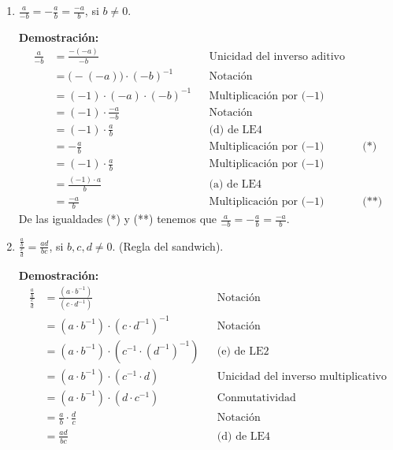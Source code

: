 \documentclass[11pt]{article}
\begin{document}
\begin{enumerate}[label=\alph*)]
    \item $\frac{a}{-b} = -\frac{a}{b}=\frac{-a}{b}$, si $b\neq 0$.
    
    \textbf{Demostración:} \begin{align*}
        \frac{a}{-b} &= \frac{-(-a)}{-b} && \text{Unicidad del inverso aditivo}\\
        &= \bigl(-(-a)\bigr) \cdot (-b)^{-1} && \text{Notación}\\
        &=(-1)\cdot (-a) \cdot (-b)^{-1} && \text{Multiplicación por ($-1$)}\\
        &=(-1) \cdot \frac{-a}{-b} && \text{Notación}\\
        &= (-1) \cdot \frac{a}{b} && \text{(d) de LE4}\\
        &= -\frac{a}{b} && \text{Multiplicación por ($-1$)} && \text{(*)}\\
        &= (-1) \cdot \frac{a}{b} && \text{Multiplicación por ($-1$)}\\
        &= \frac{(-1)\cdot a}{b} && \text{(a) de LE4}\\
        &= \frac{-a}{b} && \text{Multiplicación por ($-1$)} && \text{(**)}
    \end{align*} De las igualdades (*) y (**) tenemos que $\frac{a}{-b} = -\frac{a}{b}=\frac{-a}{b}$.

\pagebreak

    \item $\frac{\frac{a}{b}}{\frac{c}{d}} = \frac{ad}{bc}$, si $b, c, d \neq 0$. (Regla del sandwich).
    
    \textbf{Demostración:}\begin{align*}
        \frac{\frac{a}{b}}{\frac{c}{d}} &= \frac{\left( a \cdot b^{-1} \right)}{\left( c \cdot d^{-1} \right)} && \text{Notación}\\
        &= \left( a \cdot b^{-1} \right) \cdot \left( c \cdot d^{-1} \right)^{-1} && \text{Notación}\\
        &= \left( a \cdot b^{-1} \right) \cdot \left( c^{-1} \cdot \left( d^{-1} \right) ^{-1} \right) && \text{(e) de LE2}\\
        &= \left( a \cdot b^{-1} \right) \cdot \left( c^{-1} \cdot d \right) && \text{Unicidad del inverso multiplicativo}\\
        &= \left( a \cdot b^{-1} \right) \cdot \left( d \cdot c^{-1} \right) && \text{Conmutatividad}\\
        &= \frac{a}{b} \cdot \frac{d}{c} && \text{Notación}\\
        &= \frac{ad}{bc} && \text{(d) de LE4}
    \end{align*} 

\end{enumerate}
\end{document}
